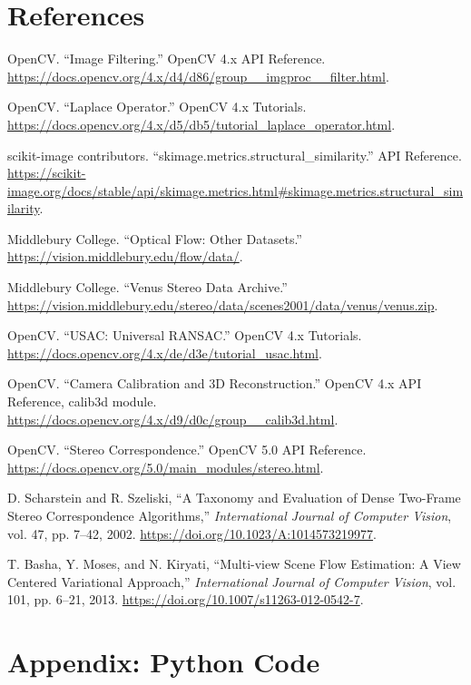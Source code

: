 \documentclass[a4paper,12pt]{article}
\begin{document}
\section{References}
\begingroup
\small
\sloppy
\raggedright
\setlength{\parskip}{0pt}
\begin{enumerate}[label={[\arabic*]},leftmargin=*,itemsep=0.25em,topsep=0.25em,parsep=0pt]
\item OpenCV. ``Image Filtering.'' OpenCV 4.x API Reference. \url{https://docs.opencv.org/4.x/d4/d86/group__imgproc__filter.html}.
\item OpenCV. ``Laplace Operator.'' OpenCV 4.x Tutorials. \url{https://docs.opencv.org/4.x/d5/db5/tutorial_laplace_operator.html}.
\item scikit-image contributors. ``skimage.metrics.structural\_similarity.'' API Reference. \url{https://scikit-image.org/docs/stable/api/skimage.metrics.html#skimage.metrics.structural_similarity}.
\item Middlebury College. ``Optical Flow: Other Datasets.'' \url{https://vision.middlebury.edu/flow/data/}.
\item Middlebury College. ``Venus Stereo Data Archive.'' \url{https://vision.middlebury.edu/stereo/data/scenes2001/data/venus/venus.zip}.
\item OpenCV. ``USAC: Universal RANSAC.'' OpenCV 4.x Tutorials. \url{https://docs.opencv.org/4.x/de/d3e/tutorial_usac.html}.
\item OpenCV. ``Camera Calibration and 3D Reconstruction.'' OpenCV 4.x API Reference, calib3d module. \url{https://docs.opencv.org/4.x/d9/d0c/group__calib3d.html}.
\item OpenCV. ``Stereo Correspondence.'' OpenCV 5.0 API Reference. \url{https://docs.opencv.org/5.0/main_modules/stereo.html}.
\item D. Scharstein and R. Szeliski, ``A Taxonomy and Evaluation of Dense Two-Frame Stereo Correspondence Algorithms,'' \emph{International Journal of Computer Vision}, vol. 47, pp. 7--42, 2002. \url{https://doi.org/10.1023/A:1014573219977}.
\item T. Basha, Y. Moses, and N. Kiryati, ``Multi-view Scene Flow Estimation: A View Centered Variational Approach,'' \emph{International Journal of Computer Vision}, vol. 101, pp. 6--21, 2013. \url{https://doi.org/10.1007/s11263-012-0542-7}.
\end{enumerate}
\endgroup

\appendix
\section{Appendix: Python Code}
\lstset{basicstyle=\ttfamily\footnotesize}
\end{document}
